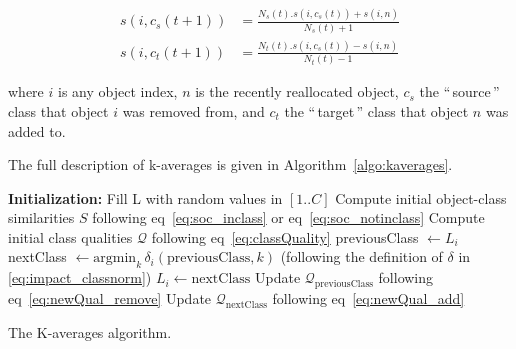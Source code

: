 \documentclass[natbib,smallextended]{svjour3}
\newcommand{\gl}[1]{``\,#1\,''} %
\begin{document}

\begin{equation}
	\begin{aligned}
    s(i, c_s(t+1)) &= \frac{N_s(t).s(i, c_s(t)) + s(i,n)}{N_s(t)+1} \\
    s(i, c_t(t+1)) &= \frac{N_t(t).s(i, c_s(t)) - s(i,n)}{N_t(t)-1}
   	\end{aligned}
  \label{eq:newSimilNewC}
\end{equation}

\noindent where $i$ is any object index, $n$ is the recently reallocated object, $c_s$ the \gl{source} class that object $i$ was removed from, and $c_t$ the \gl{target} class that object $n$ was added to.

The full description of k-averages is given in Algorithm~\ref{algo:kaverages}.

\begin{algorithm}
	\label{algo:kaverages}
	\SetAlgoLined
	\BlankLine
	\textbf{Initialization:}
		Fill L with random values in $[1..C]$\;
		Compute initial object-class similarities $S$ following eq~\ref{eq:soc_inclass} or eq~\ref{eq:soc_notinclass}\;
		Compute initial class qualities $\mathcal{Q}$ following eq~\ref{eq:classQuality}\;
	\BlankLine
	 {
		 {
			previousClass $\leftarrow L_i$\;
			nextClass $\leftarrow \mathrm{argmin}_k\,\delta_i(\mathrm{previousClass}, k)$ \label{algline:kaverages_search}
			(following the definition of $\delta$ in  \ref{eq:impact_classnorm})\; %
			 {
				$L_i \leftarrow \mathrm{nextClass}$\;
				Update $\mathcal{Q}_\mathrm{previousClass}$ following eq~\ref{eq:newQual_remove}\;
				Update $\mathcal{Q}_\mathrm{nextClass}$ following eq~\ref{eq:newQual_add}\;
			}
		}
	}
	\BlankLine
	\caption{The K-averages algorithm.}
\end{algorithm}
\end{document}
